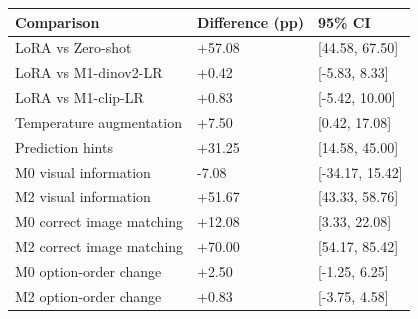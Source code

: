 \begin{tabular}{lll}
\toprule
Comparison & Difference (pp) & 95\% CI \\
\midrule
LoRA vs Zero-shot & +57.08 & [44.58, 67.50] \\
LoRA vs M1-dinov2-LR & +0.42 & [-5.83, 8.33] \\
LoRA vs M1-clip-LR & +0.83 & [-5.42, 10.00] \\
Temperature augmentation & +7.50 & [0.42, 17.08] \\
Prediction hints & +31.25 & [14.58, 45.00] \\
M0 visual information & -7.08 & [-34.17, 15.42] \\
M2 visual information & +51.67 & [43.33, 58.76] \\
M0 correct image matching & +12.08 & [3.33, 22.08] \\
M2 correct image matching & +70.00 & [54.17, 85.42] \\
M0 option-order change & +2.50 & [-1.25, 6.25] \\
M2 option-order change & +0.83 & [-3.75, 4.58] \\
\bottomrule
\end{tabular}
